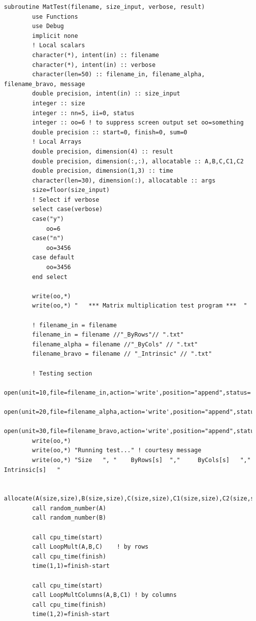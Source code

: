 \documentclass[a4paper]{article}
\begin{document}
\begin{lstlisting}
subroutine MatTest(filename, size_input, verbose, result)
        use Functions
        use Debug
        implicit none
        ! Local scalars
        character(*), intent(in) :: filename
        character(*), intent(in) :: verbose
        character(len=50) :: filename_in, filename_alpha, filename_bravo, message
        double precision, intent(in) :: size_input
        integer :: size
        integer :: nn=5, ii=0, status
        integer :: oo=6 ! to suppress screen output set oo=something
        double precision :: start=0, finish=0, sum=0
        ! Local Arrays
        double precision, dimension(4) :: result
        double precision, dimension(:,:), allocatable :: A,B,C,C1,C2
        double precision, dimension(1,3) :: time
        character(len=30), dimension(:), allocatable :: args
        size=floor(size_input)
        ! Select if verbose
        select case(verbose)
        case("y")
            oo=6
        case("n")
            oo=3456
        case default
            oo=3456
        end select

        write(oo,*)
        write(oo,*) "   *** Matrix multiplication test program ***  "
        
        ! filename_in = filename
        filename_in = filename //"_ByRows"// ".txt"
        filename_alpha = filename //"_ByCols" // ".txt"
        filename_bravo = filename // "_Intrinsic" // ".txt"

        ! Testing section 
        open(unit=10,file=filename_in,action='write',position="append",status='unknown',iostat=status)
        open(unit=20,file=filename_alpha,action='write',position="append",status='unknown',iostat=status)
        open(unit=30,file=filename_bravo,action='write',position="append",status='unknown',iostat=status)
        write(oo,*)
        write(oo,*) "Running test..." ! courtesy message
        write(oo,*) "Size   ", "    ByRows[s]  ","     ByCols[s]   ","    Intrinsic[s]   "
        
        allocate(A(size,size),B(size,size),C(size,size),C1(size,size),C2(size,size))
        call random_number(A)
        call random_number(B)
        
        call cpu_time(start)
        call LoopMult(A,B,C)    ! by rows
        call cpu_time(finish)
        time(1,1)=finish-start

        call cpu_time(start)
        call LoopMultColumns(A,B,C1) ! by columns
        call cpu_time(finish)
        time(1,2)=finish-start


\end{lstlisting}
\end{document}
